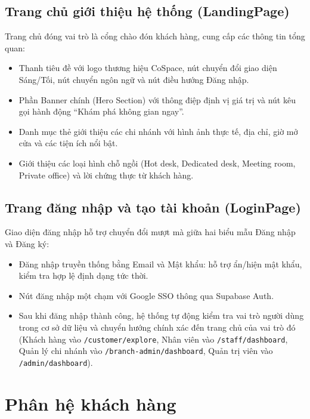 \subsection{Trang chủ giới thiệu hệ thống (LandingPage)}
Trang chủ đóng vai trò là cổng chào đón khách hàng, cung cấp các thông tin tổng quan:
\begin{itemize}
    \item Thanh tiêu đề với logo thương hiệu CoSpace, nút chuyển đổi giao diện Sáng/Tối, nút chuyển ngôn ngữ và nút điều hướng Đăng nhập.
    \item Phần Banner chính (Hero Section) với thông điệp định vị giá trị và nút kêu gọi hành động ``Khám phá không gian ngay''.
    \item Danh mục thẻ giới thiệu các chi nhánh với hình ảnh thực tế, địa chỉ, giờ mở cửa và các tiện ích nổi bật.
    \item Giới thiệu các loại hình chỗ ngồi (Hot desk, Dedicated desk, Meeting room, Private office) và lời chứng thực từ khách hàng.
\end{itemize}


\subsection{Trang đăng nhập và tạo tài khoản (LoginPage)}
Giao diện đăng nhập hỗ trợ chuyển đổi mượt mà giữa hai biểu mẫu Đăng nhập và Đăng ký:
\begin{itemize}
    \item Đăng nhập truyền thống bằng Email và Mật khẩu: hỗ trợ ẩn/hiện mật khẩu, kiểm tra hợp lệ định dạng tức thời.
    \item Nút đăng nhập một chạm với Google SSO thông qua Supabase Auth.
    \item Sau khi đăng nhập thành công, hệ thống tự động kiểm tra vai trò người dùng trong cơ sở dữ liệu và chuyển hướng chính xác đến trang chủ của vai trò đó (Khách hàng vào \texttt{/customer/explore}, Nhân viên vào \texttt{/staff/dashboard}, Quản lý chi nhánh vào \texttt{/branch-admin/dashboard}, Quản trị viên vào \texttt{/admin/dashboard}).
\end{itemize}


\section{Phân hệ khách hàng}
\label{sec:gd_khachhang}

